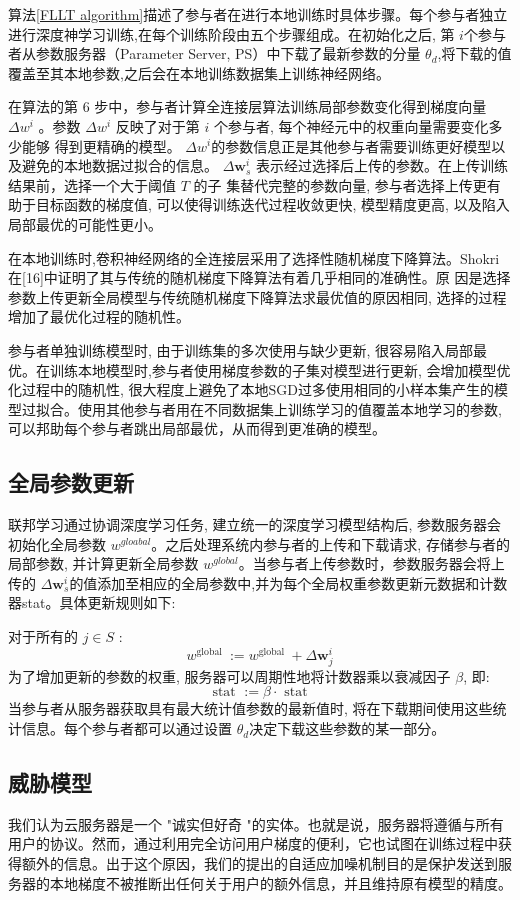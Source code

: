 算法\ref{FLLT algorithm}描述了参与者在进行本地训练时具体步骤。每个参与者独立进行深度神学习训练,在每个训练阶段由五个步骤组成。在初始化之后, 第 $i$个参与者从参数服务器（Parameter Server, PS）中下载了最新参数的分量 $\theta_{d}$,将下载的值覆盖至其本地参数,之后会在本地训练数据集上训练神经网络。

在算法的第 6 步中，参与者计算全连接层算法训练局部参数变化得到梯度向量 $\Delta w^{i}$ 。参数 $\Delta w^{i}$ 反映了对于第 $i$ 个参与者, 每个神经元中的权重向量需要变化多少能够 得到更精确的模型。 $\Delta w^{i}$的参数信息正是其他参与者需要训练更好模型以及避免的本地数据过拟合的信息。
$\Delta \boldsymbol{w}_{s}^{i}$ 表示经过选择后上传的参数。在上传训练结果前，选择一个大于阈值 $T$ 的子 集替代完整的参数向量, 参与者选择上传更有助于目标函数的梯度值, 可以使得训练迭代过程收敛更快, 模型精度更高, 以及陷入局部最优的可能性更小。

在本地训练时,卷积神经网络的全连接层采用了选择性随机梯度下降算法。Shokri在[16]中证明了其与传统的随机梯度下降算法有着几乎相同的准确性。原 因是选择参数上传更新全局模型与传统随机梯度下降算法求最优值的原因相同, 选择的过程增加了最优化过程的随机性。

参与者单独训练模型时, 由于训练集的多次使用与缺少更新, 很容易陷入局部最优。在训练本地模型时,参与者使用梯度参数的子集对模型进行更新, 会增加模型优化过程中的随机性, 很大程度上避免了本地$\mathrm{SGD}$过多使用相同的小样本集产生的模型过拟合。使用其他参与者用在不同数据集上训练学习的值覆盖本地学习的参数,可以邦助每个参与者跳出局部最优，从而得到更准确的模型。

\subsection{全局参数更新}
联邦学习通过协调深度学习任务, 建立统一的深度学习模型结构后, 参数服务器会初始化全局参数 $w^{gloabal}$。之后处理系统内参与者的上传和下载请求, 存储参与者的局部参数, 并计算更新全局参数 $w^{g l o b a l}$。当参与者上传参数时，参数服务器会将上传的 $\Delta\boldsymbol{w}_{s}^{i}$的值添加至相应的全局参数中,并为每个全局权重参数更新元数据和计数器stat。具体更新规则如下:

对于所有的 $j \in S$ :
$$
w^{\text {global }}:=w^{\text {global }}+\Delta \boldsymbol{w}_{j}^{i}
$$
为了增加更新的参数的权重, 服务器可以周期性地将计数器乘以衰减因子 $\beta$, 即:
$$
\text { stat }:=\beta \cdot \text { stat }
$$
当参与者从服务器获取具有最大统计值参数的最新值时, 将在下载期间使用这些统计信息。每个参与者都可以通过设置 $\theta_{d}$决定下载这些参数的某一部分。


\subsection{威胁模型}
我们认为云服务器是一个 "诚实但好奇 "的实体。也就是说，服务器将遵循与所有用户的协议。然而，通过利用完全访问用户梯度的便利，它也试图在训练过程中获得额外的信息。出于这个原因，我们的提出的自适应加噪机制目的是保护发送到服务器的本地梯度不被推断出任何关于用户的额外信息，并且维持原有模型的精度。


